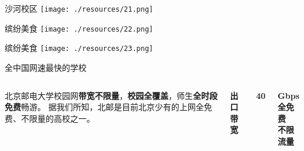 \documentclass[aspectratio=169, utf8, fontset=windows]{beamer}
\begin{document}
\begin{frame}{沙河校区}
    \centering
    \texttt{[image: ./resources/21.png]}
\end{frame}

\begin{frame}{缤纷美食}
    \centering
    \texttt{[image: ./resources/22.png]}
\end{frame}

\begin{frame}{缤纷美食}
    \centering
    \texttt{[image: ./resources/23.png]}
\end{frame}

\begin{frame}{全中国网速最快的学校}
    \begin{columns}
        \setlength{\parindent}{2em}

        北京邮电大学校园网\textcolor{Fore}{\textbf{带宽不限量}}，\textcolor{Fore}{\textbf{校园全覆盖}}，师生\textcolor{Fore}{\textbf{全时段免费}}畅游。
        据我们所知，北邮是目前北京少有的上网全免费、不限量的高校之一。

        \centering
        \textcolor{Fore}{\textbf{出口带宽}}

        \Huge \textcolor{Fore}{\textbf{40}}

        \Large \textcolor{Fore}{\textbf{Gbps}}\\[1em]

        \normalsize \textcolor{Fore}{\textbf{全免费\\不限流量}}
    \end{columns}
\end{frame}
\end{document}
